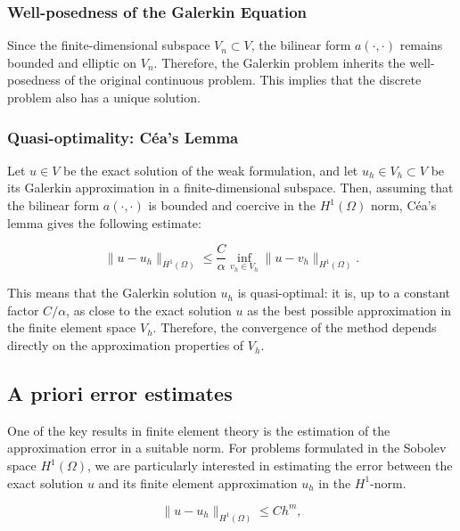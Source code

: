 \documentclass[12pt]{article}
\begin{document}
\subsubsection*{Well-posedness of the Galerkin Equation}

Since the finite-dimensional subspace \( V_n \subset V \), the bilinear form \( a(\cdot, \cdot) \) remains bounded and elliptic on \( V_n \). Therefore, the Galerkin problem inherits the well-posedness of the original continuous problem. This implies that the discrete problem also has a unique solution.

\subsubsection*{Quasi-optimality: Céa's Lemma}

Let \( u \in V \) be the exact solution of the weak formulation, and let \( u_h \in V_h \subset V \) be its Galerkin approximation in a finite-dimensional subspace. Then, assuming that the bilinear form \( a(\cdot, \cdot) \) is bounded and coercive in the \( H^1(\Omega) \) norm, Céa's lemma gives the following estimate:

\begin{equation}
\| u - u_h \|_{H^1(\Omega)} \leq \frac{C}{\alpha} \inf_{v_h \in V_h} \| u - v_h \|_{H^1(\Omega)}.
\end{equation}

This means that the Galerkin solution \( u_h \) is quasi-optimal: it is, up to a constant factor \( C / \alpha \), as close to the exact solution \( u \) as the best possible approximation in the finite element space \( V_h \). Therefore, the convergence of the method depends directly on the approximation properties of \( V_h \).


\subsection*{A priori error estimates}

One of the key results in finite element theory is the estimation of the approximation error in a suitable norm. For problems formulated in the Sobolev space \( H^1(\Omega) \), we are particularly interested in estimating the error between the exact solution \( u \) and its finite element approximation \( u_h \) in the \( H^1 \)-norm.

\begin{equation}
\| u - u_h \|_{H^1(\Omega)} \leq C h^m,
\end{equation}
\end{document}
